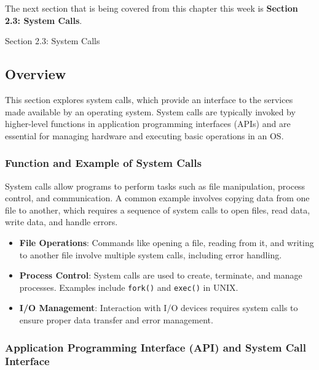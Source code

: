 The next section that is being covered from this chapter this week is \textbf{Section 2.3: System Calls}.

\begin{notes}{Section 2.3: System Calls}
    \subsection*{Overview}

    This section explores system calls, which provide an interface to the services made available by an operating system. System calls are typically invoked by higher-level functions in application 
    programming interfaces (APIs) and are essential for managing hardware and executing basic operations in an OS.
    
    \subsubsection*{Function and Example of System Calls}
    
    System calls allow programs to perform tasks such as file manipulation, process control, and communication. A common example involves copying data from one file to another, which requires a sequence 
    of system calls to open files, read data, write data, and handle errors.
    
    \begin{highlight}
    
    \begin{itemize}
        \item \textbf{File Operations}: Commands like opening a file, reading from it, and writing to another file involve multiple system calls, including error handling.
        \item \textbf{Process Control}: System calls are used to create, terminate, and manage processes. Examples include \texttt{fork()} and \texttt{exec()} in UNIX.
        \item \textbf{I/O Management}: Interaction with I/O devices requires system calls to ensure proper data transfer and error management.
    \end{itemize}
    
    \end{highlight}
    
    \subsubsection*{Application Programming Interface (API) and System Call Interface}
    

\end{notes}
